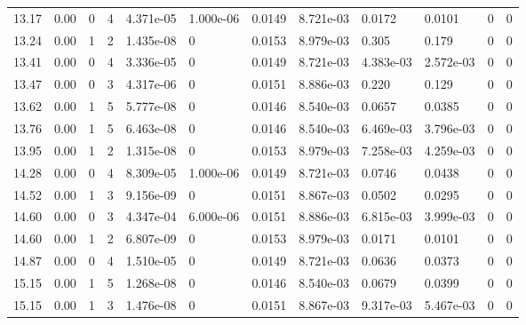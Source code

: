 \documentclass[preview]{standalone}
\begin{document}
{{{\begin{tabular}{L{1.2cm}C{1.2cm} C{0.3cm}C{0.5cm} C{1.4cm}C{1.4cm} C{1.4cm}C{1.4cm} C{1.6cm}C{1.6cm} C{1.6cm}C{1.6cm}}
  13.17  &  0.00  & 0     &  4 &  4.371e-05  & 1.000e-06  &  0.0149&   8.721e-03& 0.0172 & 0.0101   &  0 & 0  \\ 
  13.24  &  0.00  & 1     &  2 &  1.435e-08  & 0  &  0.0153&   8.979e-03& 0.305 & 0.179   &  0 & 0  \\ 
  13.41  &  0.00  & 0     &  4 &  3.336e-05  & 0  &  0.0149&   8.721e-03& 4.383e-03 & 2.572e-03   &  0 & 0  \\ 
  13.47  &  0.00  & 0     &  3 &  4.317e-06  & 0  &  0.0151&   8.886e-03& 0.220 & 0.129   &  0 & 0  \\ 
  13.62  &  0.00  & 1     &  5 &  5.777e-08  & 0  &  0.0146&   8.540e-03& 0.0657 & 0.0385   &  0 & 0  \\ 
  13.76  &  0.00  & 1     &  5 &  6.463e-08  & 0  &  0.0146&   8.540e-03& 6.469e-03 & 3.796e-03   &  0 & 0  \\ 
  13.95  &  0.00  & 1     &  2 &  1.315e-08  & 0  &  0.0153&   8.979e-03& 7.258e-03 & 4.259e-03   &  0 & 0  \\ 
  14.28  &  0.00  & 0     &  4 &  8.309e-05  & 1.000e-06  &  0.0149&   8.721e-03& 0.0746 & 0.0438   &  0 & 0  \\ 
  14.52  &  0.00  & 1     &  3 &  9.156e-09  & 0  &  0.0151&   8.867e-03& 0.0502 & 0.0295   &  0 & 0  \\ 
  14.60  &  0.00  & 0     &  3 &  4.347e-04  & 6.000e-06  &  0.0151&   8.886e-03& 6.815e-03 & 3.999e-03   &  0 & 0  \\ 
  14.60  &  0.00  & 1     &  2 &  6.807e-09  & 0  &  0.0153&   8.979e-03& 0.0171 & 0.0101   &  0 & 0  \\ 
  14.87  &  0.00  & 0     &  4 &  1.510e-05  & 0  &  0.0149&   8.721e-03& 0.0636 & 0.0373   &  0 & 0  \\ 
  15.15  &  0.00  & 1     &  5 &  1.268e-08  & 0  &  0.0146&   8.540e-03& 0.0679 & 0.0399   &  0 & 0  \\ 
  15.15  &  0.00  & 1     &  3 &  1.476e-08  & 0  &  0.0151&   8.867e-03& 9.317e-03 & 5.467e-03   &  0 & 0  \\ 
\hline 
\end{tabular} 

}}}
\end{document}
